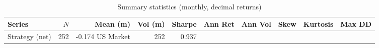 \begin{table}[!ht]
\centering
\caption{Summary statistics (monthly, decimal returns)}
\label{tab:summary_stats}
\begin{tabular}{lrrrrrrrrr}
\toprule
Series & $N$ & Mean (m) & Vol (m) & Sharpe & Ann Ret & Ann Vol & Skew & Kurtosis & Max DD \\
\midrule
Strategy (net) & 252 & -0.174%
US Market & 252 & 0.937%
\bottomrule
\end{tabular}
\end{table}
